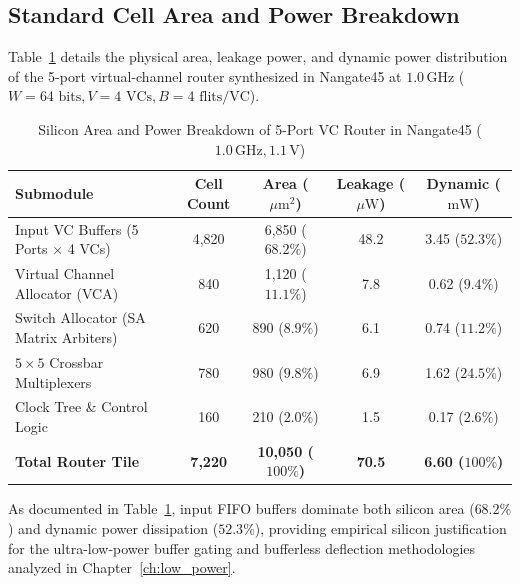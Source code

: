 \subsection{Standard Cell Area and Power Breakdown}
Table~\ref{tab:app_ppa} details the physical area, leakage power, and dynamic power distribution of the 5-port virtual-channel router synthesized in Nangate45 at $1.0\,\mathrm{GHz}$ ($W = 64\text{ bits}, V = 4\text{ VCs}, B = 4\text{ flits/VC}$).

\begin{table}[htbp]
\centering
\caption{Silicon Area and Power Breakdown of 5-Port VC Router in Nangate45 ($1.0\,\mathrm{GHz}, 1.1\,\mathrm{V}$)}
\label{tab:app_ppa}
\begin{tabular}{lcccc}
\toprule
\textbf{Submodule} & \textbf{Cell Count} & \textbf{Area ($\mu\mathrm{m^2}$)} & \textbf{Leakage ($\mu\mathrm{W}$)} & \textbf{Dynamic ($\mathrm{mW}$)} \\
\midrule
Input VC Buffers (5 Ports $\times$ 4 VCs) & 4,820 & 6,850 ($68.2\%$) & 48.2 & 3.45 ($52.3\%$) \\
Virtual Channel Allocator (VCA)           & 840   & 1,120 ($11.1\%$) & 7.8  & 0.62 ($9.4\%$) \\
Switch Allocator (SA Matrix Arbiters)     & 620   & 890 ($8.9\%$)    & 6.1  & 0.74 ($11.2\%$) \\
$5 \times 5$ Crossbar Multiplexers        & 780   & 980 ($9.8\%$)    & 6.9  & 1.62 ($24.5\%$) \\
Clock Tree \& Control Logic               & 160   & 210 ($2.0\%$)    & 1.5  & 0.17 ($2.6\%$) \\
\midrule
\textbf{Total Router Tile}                & \textbf{7,220} & \textbf{10,050 ($100\%$)} & \textbf{70.5} & \textbf{6.60 ($100\%$)} \\
\bottomrule
\end{tabular}
\end{table}

As documented in Table~\ref{tab:app_ppa}, input FIFO buffers dominate both silicon area ($68.2\%$) and dynamic power dissipation ($52.3\%$), providing empirical silicon justification for the ultra-low-power buffer gating and bufferless deflection methodologies analyzed in Chapter~\ref{ch:low_power}.
